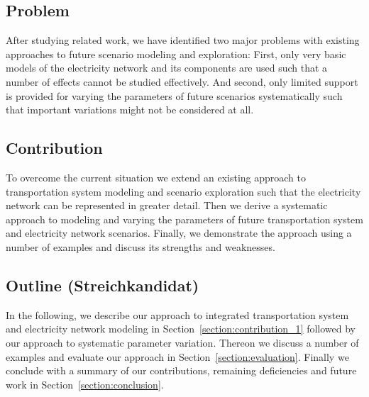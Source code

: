 \subsection{Problem}

After studying related work, we have identified two major problems with existing approaches to future scenario modeling and exploration: First, only very basic models of the electricity network and its components are used such that a number of effects cannot be studied effectively. And second, only limited support is provided for varying the parameters of future scenarios systematically such that important variations might not be considered at all.

\subsection{Contribution}

To overcome the current situation we extend an existing approach to transportation system modeling and scenario exploration such that the electricity network can be represented in greater detail. Then we derive a systematic approach to modeling and varying the parameters of future transportation system and electricity network scenarios. Finally, we demonstrate the approach using a number of examples and discuss its strengths and weaknesses.



\subsection{Outline (Streichkandidat)}

In the following, we describe our approach to integrated transportation system and electricity network modeling in Section~\ref{section:contribution_1} followed by our approach to systematic parameter variation. Thereon we discuss a number of examples and evaluate our approach in Section~\ref{section:evaluation}. Finally we conclude with a summary of our contributions, remaining deficiencies and future work in Section~\ref{section:conclusion}.